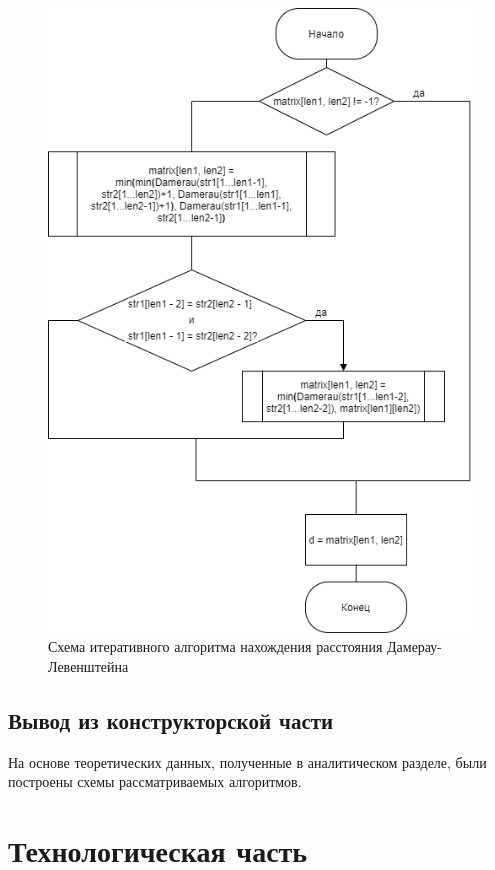 \documentclass[12pt]{report}
\begin{document}
\begin{figure}[hp!]
	\centering
	\includegraphics[scale=0.75]{report_files/recursive_damerau_levenshtein.png}
	\caption{Схема итеративного алгоритма нахождения расстояния Дамерау-Левенштейна}
	\label{fig:mpr}
\end{figure}

\newpage
\section{Вывод из конструкторской части}
	На основе теоретических данных, полученные в аналитическом разделе, были построены схемы рассматриваемых алгоритмов.

\chapter{Технологическая часть}
\end{document}
